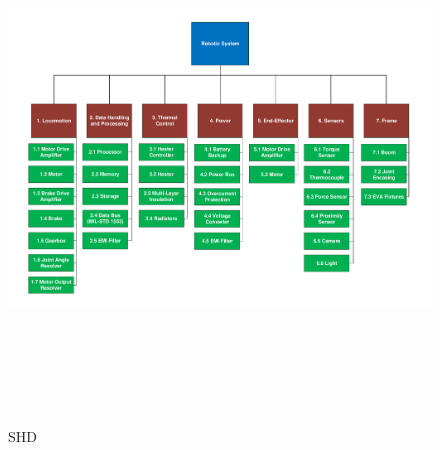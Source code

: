 \begin{figure}[H]
\centering
\includegraphics[width=9in, height=5.5in, keepaspectratio]{Figures/SHD}
\caption{\acrlong{SHD}}
\label{fig:SHD}
\end{figure}
